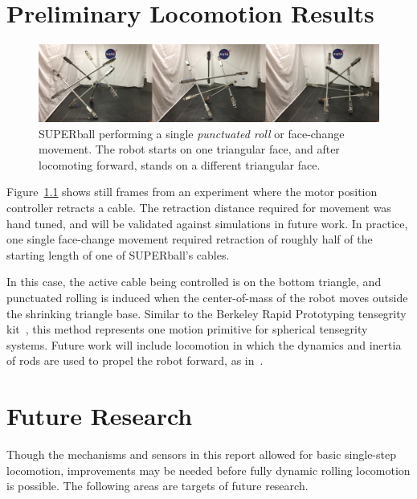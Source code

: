 \documentclass[12pt]{report}
\begin{document}


\chapter{Preliminary Locomotion Results}

\begin{figure}[thbp]
    \centering
    \includegraphics[width=1\linewidth]{img/superball_flop_combined.jpg}
    \caption{SUPERball performing a single \emph{punctuated roll} or face-change movement. The robot starts on one triangular face, and after locomoting forward, stands on a different triangular face.~\cite{sabelhaus2015system}}
    \label{fig:superball_flop_flat}
\end{figure}

Figure~\ref{fig:superball_flop_flat} shows still frames from an experiment where the motor position controller retracts a cable.
The retraction distance required for movement was hand tuned, and will be validated against simulations in future work.
In practice, one single face-change movement required retraction of roughly half of the starting length of one of SUPERball's cables.

In this case, the active cable being controlled is on the bottom triangle, and punctuated rolling is induced when the center-of-mass of the robot moves outside the shrinking triangle base.
Similar to the Berkeley Rapid Prototyping tensegrity kit~\cite{kim2014rapid}, this method represents one motion primitive for spherical tensegrity systems.
Future work will include locomotion in which the dynamics and inertia of rods are used to propel the robot forward, as in~\cite{Iscen2013,Iscen2013b}.

\chapter{Future Research}

Though the mechanisms and sensors in this report allowed for basic single-step locomotion, improvements may be needed before fully dynamic rolling locomotion is possible. 
The following areas are targets of future research.
\end{document}
